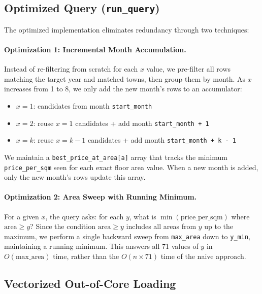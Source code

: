 \documentclass[11pt,a4paper]{article}
\begin{document}
\subsection{Optimized Query (\texttt{run\_query})}

The optimized implementation eliminates redundancy through two techniques:

\paragraph{Optimization 1: Incremental Month Accumulation.}
Instead of re-filtering from scratch for each $x$ value, we pre-filter all rows matching the target year and matched towns, then group them by month. As $x$ increases from 1 to 8, we only add the new month's rows to an accumulator:

\begin{itemize}[nosep]
    \item $x = 1$: candidates from month \texttt{start\_month}
    \item $x = 2$: reuse $x = 1$ candidates + add month \texttt{start\_month + 1}
    \item $x = k$: reuse $x = k{-}1$ candidates + add month \texttt{start\_month + k - 1}
\end{itemize}

We maintain a \texttt{best\_price\_at\_area[a]} array that tracks the minimum \texttt{price\_per\_sqm} seen for each exact floor area value. When a new month is added, only the new month's rows update this array.

\paragraph{Optimization 2: Area Sweep with Running Minimum.}
For a given $x$, the query asks: for each $y$, what is $\min(\text{price\_per\_sqm})$ where $\text{area} \geq y$? Since the condition $\text{area} \geq y$ includes all areas from $y$ up to the maximum, we perform a single backward sweep from \texttt{max\_area} down to \texttt{y\_min}, maintaining a running minimum. This answers all 71 values of $y$ in $O(\text{max\_area})$ time, rather than the $O(n \times 71)$ time of the naive approach.

\subsection{Vectorized Out-of-Core Loading}
\label{sec:vectorized}
\end{document}
